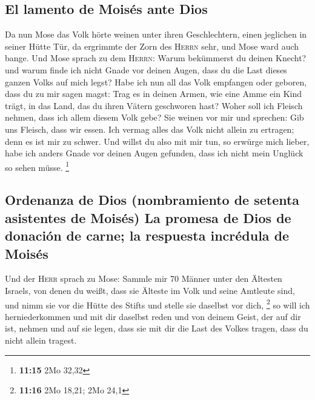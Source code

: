 \hypertarget{el-lamento-de-moisuxe9s-ante-dios}{%
\subsection{El lamento de Moisés ante
Dios}\label{el-lamento-de-moisuxe9s-ante-dios}}

 Da nun Mose das Volk hörte weinen unter ihren
Geschlechtern, einen jeglichen in seiner Hütte Tür, da ergrimmte der
Zorn des \textsc{Herrn} sehr, und Mose ward auch bange. 
Und Mose sprach zu dem \textsc{Herrn}: Warum bekümmerst du deinen
Knecht? und warum finde ich nicht Gnade vor deinen Augen, dass du die
Last dieses ganzen Volks auf mich legst?  Habe ich nun
all das Volk empfangen oder geboren, dass du zu mir sagen magst: Trag es
in deinen Armen, wie eine Amme ein Kind trägt, in das Land, das du ihren
Vätern geschworen hast?  Woher soll ich Fleisch nehmen,
dass ich allem diesem Volk gebe? Sie weinen vor mir und sprechen: Gib
uns Fleisch, dass wir essen.  Ich vermag alles das Volk
nicht allein zu ertragen; denn es ist mir zu schwer.  Und
willst du also mit mir tun, so erwürge mich lieber, habe ich anders
Gnade vor deinen Augen gefunden, dass ich nicht mein Unglück so sehen
müsse. \footnote{\textbf{11:15} 2Mo 32,32}

\hypertarget{ordenanza-de-dios-nombramiento-de-setenta-asistentes-de-moisuxe9s-la-promesa-de-dios-de-donaciuxf3n-de-carne-la-respuesta-incruxe9dula-de-moisuxe9s}{%
\subsection{Ordenanza de Dios (nombramiento de setenta asistentes de
Moisés) La promesa de Dios de donación de carne; la respuesta incrédula
de
Moisés}\label{ordenanza-de-dios-nombramiento-de-setenta-asistentes-de-moisuxe9s-la-promesa-de-dios-de-donaciuxf3n-de-carne-la-respuesta-incruxe9dula-de-moisuxe9s}}

 Und der \textsc{Herr} sprach zu Mose: Sammle mir 70
Männer unter den Ältesten Israels, von denen du weißt, dass sie Älteste
im Volk und seine Amtleute sind, und nimm sie vor die Hütte des Stifts
und stelle sie daselbst vor dich, \footnote{\textbf{11:16} 2Mo 18,21;
  2Mo 24,1}  so will ich herniederkommen und mit dir
daselbst reden und von deinem Geist, der auf dir ist, nehmen und auf sie
legen, dass sie mit dir die Last des Volkes tragen, dass du nicht allein
tragest.

